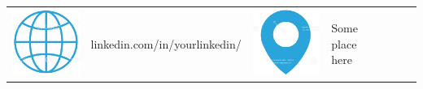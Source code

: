 \documentclass[a4paper,10pt]{article}
\newcommand\Tstrut{\rule{0pt}{3ex}}         %
\newcommand\Bstrut{\rule[-1.5ex]{0pt}{0pt}}   %
\begin{document}
\begin{table}[H]
\begin{tabular}{r l | r l | r l | r l}
 \includegraphics[scale=0.015]{icons/url.jpeg} \hspace{-1.3em} & linkedin.com/in/yourlinkedin/ & 
 \includegraphics[scale=0.015]{icons/location.jpeg} \hspace{-1.3em} & Some place here \Tstrut\Bstrut\\
\end{tabular}

\end{table}
\end{document}
